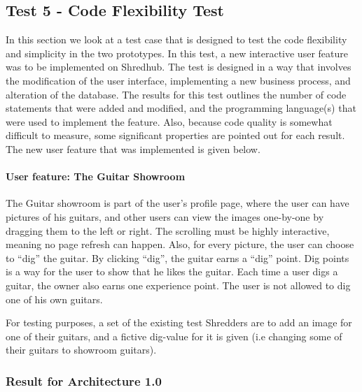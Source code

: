 \subsection{Test 5 - Code Flexibility Test}
In this section we look at a test case that is designed to test the code flexibility and simplicity in the two prototypes. In this test, a new interactive user feature was to be implemented on Shredhub. The test is designed in a way that involves the modification of the user interface, implementing a new business process, and alteration of the database. The results for this test outlines the number of code statements that were added and modified, and the programming language(s) that were used to implement the feature. Also, because code quality is somewhat difficult to measure, some significant properties are pointed out for each result. The new user feature that was implemented is given below.

\paragraph{User feature: The Guitar Showroom}
The Guitar showroom is part of the user's profile page, where the user can have pictures of his guitars,  and other users can view the images one-by-one by dragging them to the left or right. The scrolling must be highly interactive, meaning no page refresh can happen.  Also, for every picture, the user can choose to ``dig'' the guitar. By clicking ``dig'', the guitar earns a ``dig'' point. Dig points is a way for the user to show that he likes the guitar. Each time a user digs a guitar, the owner also earns one experience point. The user is not allowed to dig one of his own guitars. 

For testing purposes, a set of the existing test Shredders are to add an image for one of their guitars, and a fictive dig-value for it is given (i.e changing some of their guitars to showroom guitars).

\subsubsection{Result for Architecture 1.0}
%


